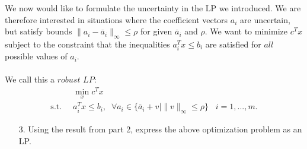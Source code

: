 \documentclass[11pt]{article}
\begin{document}
    We now would like to formulate the uncertainty in the LP we introduced. We are therefore interested in situations where the coefficient vectors $a_i$ are uncertain, but satisfy bounds $\|a_i - \overline{a}_i\|_{\infty} \leq \rho$  for given $\overline{a}_i$ and $\rho$. We want to minimize $c^Tx$ subject to the constraint that the inequalities $a_i^Tx \leq b_i$ are satisfied for $\textit{all}$ possible values of $a_i$. \\ \\
    We call this a $\textit{robust LP}:$
    \begin{align}
    &\min_x c^Tx \nonumber \\
    \label{RLP}
    \text{s.t.} \; \;  &a_i^Tx \leq b_i, \; \; \forall a_i \in \{ \overline{a}_i + v \mid \|v\|_{\infty} \leq \rho \} \; \; \; i = 1,...,m.
\end{align}

\begin{enumerate}
    \item[3.] Using the result from part 2, express the above optimization problem as an LP.

\end{enumerate}

\begin{solution}
\end{solution}
\end{document}
